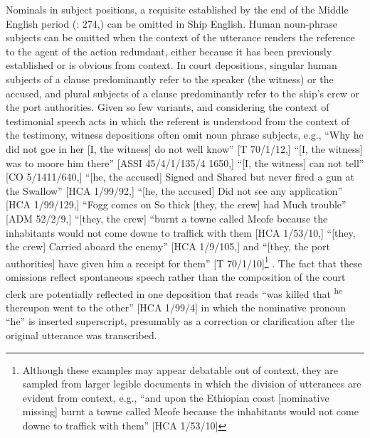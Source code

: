 Nominals in subject positions, a requisite established by the end of the Middle English period (\citealt{MillwardHayes2012}: 274,) can be omitted in Ship English. Human noun-phrase subjects can be omitted when the context of the utterance renders the reference to the agent of the action redundant, either because it has been previously established or is obvious from context. In court depositions, singular human subjects of a clause predominantly refer to the speaker (the witness) or the accused, and plural subjects of a clause predominantly refer to the ship’s crew or the port authorities. Given so few variants, and considering the context of testimonial speech acts in which the referent is understood from the context of the testimony, witness depositions often omit noun phrase subjects, e.g., “Why he did not goe in her [I, the witness] do not well know” [T 70/1/12,] “[I, the witness] was to moore him there” [ASSI 45/4/1/135/4 1650,] “[I, the witness] can not tell” [CO 5/1411/640,] “[he, the accused] Signed and Shared but never fired a gun at the Swallow” [HCA 1/99/92,] “[he, the accused] Did not see any application” [HCA 1/99/129,] “Fogg comes on So thick [they, the crew] had Much trouble” [ADM 52/2/9,] “[they, the crew] “burnt a towne called Meofe because the inhabitants would not come downe to traffick with them [HCA 1/53/10,] “[they, the crew] Carried aboard the enemy” [HCA 1/9/105,] and “[they, the port authorities] have given him a receipt for them” [T 70/1/10]\footnote{Although these examples may appear debatable out of context, they are sampled from larger legible documents in which the division of utterances are evident from context, e.g., “and upon the Ethiopian coast [nominative missing] burnt a towne called Meofe because the inhabitants would not come downe to traffick with them” [HCA 1/53/10]} . The fact that these omissions reflect spontaneous speech rather than the composition of the court clerk are potentially reflected in one deposition that reads “was killed that \textsuperscript{he} thereupon went to the other” [HCA 1/99/4] in which the nominative pronoun “he” is inserted superscript, presumably as a correction or clarification after the original utterance was transcribed. 

